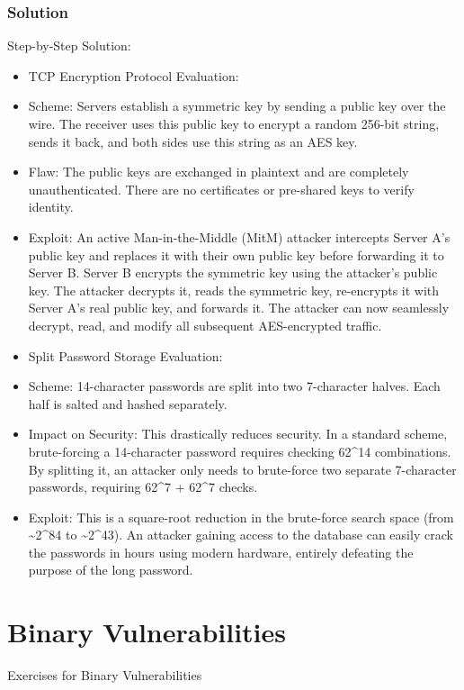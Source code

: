 \documentclass{article}
\begin{document}
\subsubsection*{Solution}
Step-by-Step Solution:

\begin{itemize}
    \item[\textbf{1.}] TCP Encryption Protocol Evaluation:
    \item Scheme: Servers establish a symmetric key by sending a public key over the wire. The receiver uses this public key to encrypt a random 256-bit string, sends it back, and both sides use this string as an AES key.
    \item Flaw: The public keys are exchanged in plaintext and are completely unauthenticated. There are no certificates or pre-shared keys to verify identity.
    \item Exploit: An active Man-in-the-Middle (MitM) attacker intercepts Server A's public key and replaces it with their own public key before forwarding it to Server B. Server B encrypts the symmetric key using the attacker's public key. The attacker decrypts it, reads the symmetric key, re-encrypts it with Server A's real public key, and forwards it. The attacker can now seamlessly decrypt, read, and modify all subsequent AES-encrypted traffic.

    \item[\textbf{2.}] Split Password Storage Evaluation:
    \item Scheme: 14-character passwords are split into two 7-character halves. Each half is salted and hashed separately.
    \item Impact on Security: This drastically reduces security. In a standard scheme, brute-forcing a 14-character password requires checking 62\textasciicircum{}14 combinations. By splitting it, an attacker only needs to brute-force two separate 7-character passwords, requiring 62\textasciicircum{}7 + 62\textasciicircum{}7 checks.
    \item Exploit: This is a square-root reduction in the brute-force search space (from \textasciitilde{}2\textasciicircum{}84 to \textasciitilde{}2\textasciicircum{}43). An attacker gaining access to the database can easily crack the passwords in hours using modern hardware, entirely defeating the purpose of the long password.
\end{itemize}


\section{Binary Vulnerabilities}
Exercises for Binary Vulnerabilities
\end{document}
